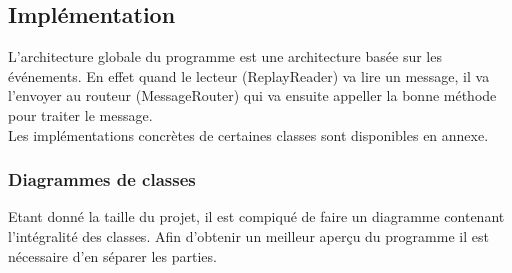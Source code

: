 \documentclass{article}
\begin{document}
\subsection{Implémentation}

L'architecture globale du programme est une architecture basée sur les événements. En effet quand le lecteur (ReplayReader) va lire un message, il va l'envoyer au routeur (MessageRouter) qui va ensuite appeller la bonne méthode pour traiter le message.\\

Les implémentations concrètes de certaines classes sont disponibles en annexe.

\subsubsection{Diagrammes de classes}

Etant donné la taille du projet, il est compiqué de faire un diagramme contenant l'intégralité des classes. Afin d'obtenir un meilleur aperçu du programme il est nécessaire d'en séparer les parties.\\
\newpage
\end{document}
